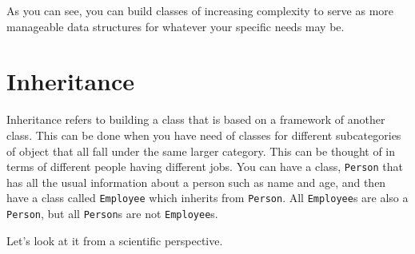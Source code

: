     As you can see, you can build classes of increasing complexity to serve
as more manageable data structures for whatever your specific needs may
be.
\section{Inheritance}
Inheritance refers to building a class that is based on a framework of
another class. This can be done when you have need of classes for
different subcategories of object that all fall under the same larger
category. This can be thought of in terms of different people having
different jobs. You can have a class, \texttt{Person} that has all the
usual information about a person such as name and age, and then have a
class called \texttt{Employee} which inherits from \texttt{Person}. All
\texttt{Employee}s are also a \texttt{Person}, but all \texttt{Person}s
are not \texttt{Employee}s.

Let's look at it from a scientific perspective.

